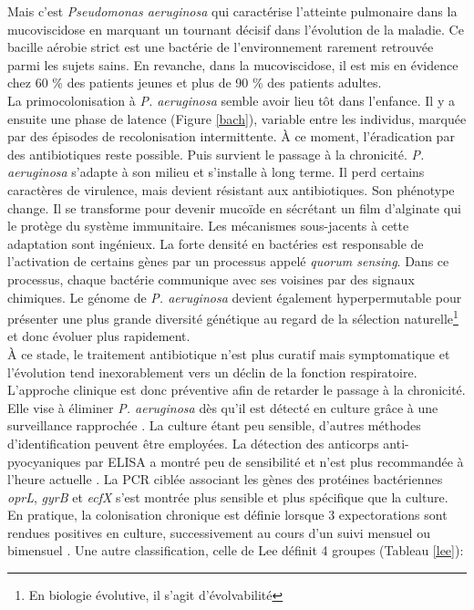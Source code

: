 \documentclass[12pt,a4paper]{article}
\begin{document}
Mais c’est \textit{Pseudomonas aeruginosa} qui caractérise l’atteinte pulmonaire dans la mucoviscidose en marquant un tournant décisif dans l’évolution de la maladie. Ce bacille aérobie strict est une bactérie de l'environnement rarement retrouvée parmi les sujets sains\cite{Plesiat}. En revanche, dans la mucoviscidose, il est mis en évidence\cite{LeBourgeois} chez 60 \% des patients jeunes et plus de 90 \% des patients adultes.\\
La primocolonisation à \textit{P. aeruginosa} semble avoir lieu tôt dans l’enfance\cite{Plesiat}. Il y a ensuite une phase de latence (Figure \ref{bach}), variable entre les individus, marquée par des épisodes de recolonisation intermittente. À ce moment, l’éradication par des antibiotiques reste possible.
Puis survient le passage à la chronicité. \textit{P. aeruginosa} s'adapte à son milieu et s’installe à long terme. Il perd certains caractères de virulence, mais devient résistant aux antibiotiques\cite{LeBourgeois}. Son phénotype change. Il se transforme pour devenir mucoïde en sécrétant un film d’alginate qui le protège du système immunitaire. Les mécanismes sous-jacents à cette adaptation sont ingénieux. La forte densité en bactéries est responsable de l’activation de certains gènes par un processus appelé \textit{quorum sensing}\cite{Ruimy2004}. Dans ce processus, chaque bactérie communique avec ses voisines par des signaux chimiques.
Le génome de \textit{P. aeruginosa} devient également hyperpermutable\cite{Davies} pour présenter une plus grande diversité génétique au regard de la sélection naturelle\footnote{En biologie évolutive, il s'agit d'évolvabilité} et donc évoluer plus rapidement. \\
À ce stade, le traitement antibiotique n’est plus curatif mais symptomatique et l'évolution tend inexorablement vers un déclin de la fonction respiratoire. \\
L'approche clinique est donc préventive afin de retarder le passage à la chronicité. Elle vise à éliminer \textit{P. aeruginosa} dès qu'il est détecté en culture grâce à une surveillance rapprochée \cite{LeBourgeois}. La culture étant peu sensible, d’autres méthodes d'identification peuvent être employées. La détection des anticorps anti-pyocyaniques par ELISA a montré peu de sensibilité et n'est plus recommandée à l'heure actuelle \cite{Microbiologie2015}.
La PCR ciblée associant les gènes des protéines bactériennes \textit{oprL}, \textit{gyrB} et \textit{ecfX} s’est montrée plus sensible et plus spécifique que la culture\cite{Hery-Arnaud2017}. \\
En pratique, la colonisation chronique est définie lorsque 3 expectorations sont rendues positives en culture, successivement au cours d’un suivi mensuel ou bimensuel \cite{LeBourgeois}.
Une autre classification, celle de Lee\cite{Lee2003} définit 4 groupes (Tableau \ref{lee}):
\end{document}
